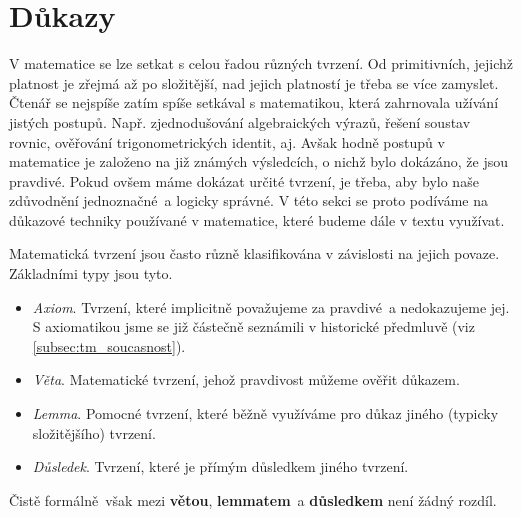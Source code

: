 \chapter{Důkazy}\label{chap:dukazy}
V matematice se lze setkat s celou řadou různých tvrzení. Od primitivních, jejichž platnost je zřejmá až po složitější, nad jejich platností je třeba se více zamyslet. Čtenář se nejspíše zatím spíše setkával s matematikou, která zahrnovala užívání jistých postupů. Např. zjednodušování algebraických výrazů, řešení soustav rovnic, ověřování trigonometrických identit, aj. Avšak hodně postupů v matematice je založeno na již známých výsledcích, o nichž bylo dokázáno, že jsou pravdivé. Pokud ovšem máme dokázat určité tvrzení, je třeba, aby bylo naše zdůvodnění jednoznačné~a logicky správné. V této sekci se proto podíváme na důkazové techniky používané v matematice, které budeme dále v textu využívat.\par
Matematická tvrzení jsou často různě klasifikována v závislosti na jejich povaze. Základními typy jsou tyto. 
\begin{itemize}
    \item \emph{Axiom}. Tvrzení, které implicitně považujeme za pravdivé~a nedokazujeme jej. S axiomatikou jsme se již částečně seznámili v historické předmluvě (viz \ref{subsec:tm_soucasnost}).
    \item \emph{Věta}. Matematické tvrzení, jehož pravdivost můžeme ověřit důkazem.
    \item \emph{Lemma}. Pomocné tvrzení, které běžně využíváme pro důkaz jiného (typicky složitějšího) tvrzení.
    \item \emph{Důsledek}. Tvrzení, které je přímým důsledkem jiného tvrzení.
\end{itemize}
Čistě formálně~však mezi \textbf{větou}, \textbf{lemmatem}~a \textbf{důsledkem} není žádný rozdíl.

